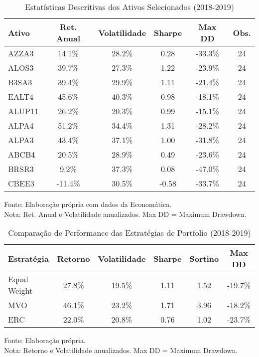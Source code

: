 \begin{table}[htbp]
\centering
\caption{Estatísticas Descritivas dos Ativos Selecionados (2018-2019)}
\label{tab:estatisticas_individuais}
\begin{tabular}{|l|c|c|c|c|c|}
\hline
\textbf{Ativo} & \textbf{Ret. Anual} & \textbf{Volatilidade} & \textbf{Sharpe} & \textbf{Max DD} & \textbf{Obs.} \\
\hline
AZZA3 & 14.1\% & 28.2\% & 0.28 & -33.3\% & 24 \\
ALOS3 & 39.7\% & 27.3\% & 1.22 & -23.9\% & 24 \\
B3SA3 & 39.4\% & 29.9\% & 1.11 & -21.4\% & 24 \\
EALT4 & 45.6\% & 40.3\% & 0.98 & -18.1\% & 24 \\
ALUP11 & 26.2\% & 20.3\% & 0.99 & -15.1\% & 24 \\
ALPA4 & 51.2\% & 34.4\% & 1.31 & -28.2\% & 24 \\
ALPA3 & 43.4\% & 37.1\% & 1.00 & -31.8\% & 24 \\
ABCB4 & 20.5\% & 28.9\% & 0.49 & -23.6\% & 24 \\
BRSR3 & 9.2\% & 37.3\% & 0.08 & -47.0\% & 24 \\
CBEE3 & -11.4\% & 30.5\% & -0.58 & -33.7\% & 24 \\
\hline
\end{tabular}
\footnotesize
Fonte: Elaboração própria com dados da Economática.\\
Nota: Ret. Anual e Volatilidade anualizados. Max DD = Maximum Drawdown.
\end{table}


\begin{table}[htbp]
\centering
\caption{Comparação de Performance das Estratégias de Portfolio (2018-2019)}
\label{tab:performance_estrategias}
\begin{tabular}{|l|c|c|c|c|c|}
\hline
\textbf{Estratégia} & \textbf{Retorno} & \textbf{Volatilidade} & \textbf{Sharpe} & \textbf{Sortino} & \textbf{Max DD} \\
\hline
Equal Weight & 27.8\% & 19.5\% & 1.11 & 1.52 & -19.7\% \\
MVO & 46.1\% & 23.2\% & 1.71 & 3.96 & -18.2\% \\
ERC & 22.0\% & 20.8\% & 0.76 & 1.02 & -23.7\% \\
\hline
\end{tabular}
\footnotesize
Fonte: Elaboração própria.\\
Nota: Retorno e Volatilidade anualizados. Max DD = Maximum Drawdown.
\end{table}


